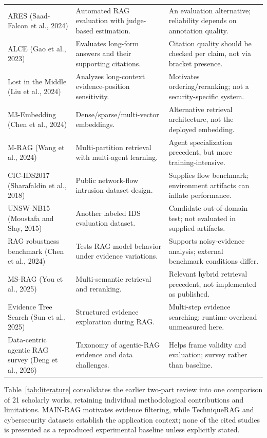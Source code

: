 \documentclass[journal,twoside]{IEEEtran}
\begin{document}
\begin{table}[!tp]
\begin{tabular}{p{}p{}p{}}
ARES (Saad-Falcon et al., 2024) \cite{ares} & Automated RAG evaluation with judge-based estimation. & An evaluation alternative; reliability depends on annotation quality.\\
ALCE (Gao et al., 2023) \cite{alce} & Evaluates long-form answers and their supporting citations. & Citation quality should be checked per claim, not via bracket presence.\\
Lost in the Middle (Liu et al., 2024) \cite{lostmiddle} & Analyzes long-context evidence-position sensitivity. & Motivates ordering/reranking; not a security-specific system.\\
M3-Embedding (Chen et al., 2024) \cite{m3embed} & Dense/sparse/multi-vector embeddings. & Alternative retrieval architecture, not the deployed embedding.\\
M-RAG (Wang et al., 2024) \cite{mrag} & Multi-partition retrieval with multi-agent learning. & Agent specialization precedent, but more training-intensive.\\
CIC-IDS2017 (Sharafaldin et al., 2018) \cite{cicpaper} & Public network-flow intrusion dataset design. & Supplies flow benchmark; environment artifacts can inflate performance.\\
UNSW-NB15 (Moustafa and Slay, 2015) \cite{unswpaper} & Another labeled IDS evaluation dataset. & Candidate out-of-domain test; not evaluated in supplied artifacts.\\
RAG robustness benchmark (Chen et al., 2024) \cite{ragbench} & Tests RAG model behavior under evidence variations. & Supports noisy-evidence analysis; external benchmark conditions differ.\\
MS-RAG (You et al., 2025) \cite{msrag} & Multi-semantic retrieval and reranking. & Relevant hybrid retrieval precedent, not implemented as published.\\
Evidence Tree Search (Sun et al., 2025) \cite{evtree} & Structured evidence exploration during RAG. & Multi-step evidence searching; runtime overhead unmeasured here.\\
Data-centric agentic RAG survey (Deng et al., 2026) \cite{datasurvey} & Taxonomy of agentic-RAG evidence and data challenges. & Helps frame validity and evaluation; survey rather than baseline.\\
\bottomrule
\end{tabular}
\end{table}

Table~\ref{tab:literature} consolidates the earlier two-part review into one comparison of 21 scholarly works, retaining individual methodological contributions and limitations. MAIN-RAG motivates evidence filtering, while TechniqueRAG and cybersecurity datasets establish the application context; none of the cited studies is presented as a reproduced experimental baseline unless explicitly stated.
\end{document}
